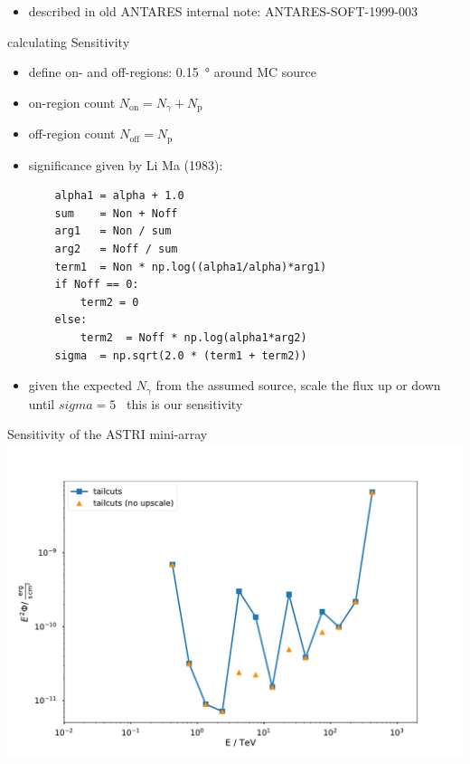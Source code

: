 \documentclass[8pt]{beamer}
\newcommand\unit[2]{\SI{#1}{#2}}
\begin{document}
\begin{frame}
\begin{itemize}
{            }
            \pause\pause\pause\pause\pause
            \item described in old ANTARES internal note: ANTARES-SOFT-1999-003
        \end{itemize}

    \end{frame}


    \begin{frame}{Expected Events from Crab and Cosmic Rays}
        \centering
        }
        \only<2>{
            \texttt{[image: \{pics/theta\_square\_tail]}.pdf}
        }
    \end{frame}


    \begin{frame}[fragile]{calculating Sensitivity}
        \begin{itemize}
            \item define on- and off-regions: \unit{0.15}{\degree} around MC source
            \item[] on-region count $N_\mathrm{on} = N_\gamma + N_\mathrm{p}$
            \item[] off-region count $N_\mathrm{off} = N_\mathrm{p}$
            \item significance given by Li Ma (1983):
            \begin{verbatim}
    alpha1 = alpha + 1.0
    sum    = Non + Noff
    arg1   = Non / sum
    arg2   = Noff / sum
    term1  = Non * np.log((alpha1/alpha)*arg1)
    if Noff == 0:
        term2 = 0
    else:
        term2  = Noff * np.log(alpha1*arg2)
    sigma  = np.sqrt(2.0 * (term1 + term2))
            \end{verbatim}
            \item given the expected $N_\gamma$ from the assumed source, scale the flux up
                or down until $sigma = 5$ \textrightarrow\ this is our sensitivity
        \end{itemize}
    \end{frame}


    \begin{frame}{Sensitivity of the ASTRI mini-array}
        \centering
        \includegraphics[width=\textwidth]{pics/sensitivity}
    \end{frame}
\end{document}
